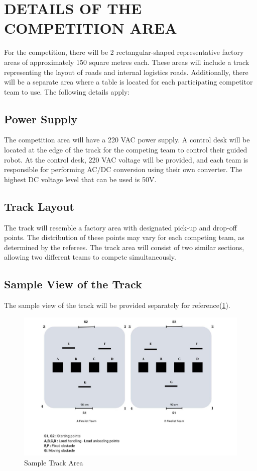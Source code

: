 \documentclass[../../main]{subfiles}
\begin{document}
\section{DETAILS OF THE COMPETITION AREA}

For the competition, there will be 2 rectangular-shaped representative factory areas of approximately 150 square metres each. These areas will include a track representing the layout of roads and internal logistics roads. Additionally, there will be a separate area where a table is located for each participating competitor team to use. The following details apply:

\subsection{Power Supply}
The competition area will have a 220 VAC power supply. A control desk will be located at the edge of the track for the competing team to control their guided robot. At the control desk, 220 VAC voltage will be provided, and each team is responsible for performing AC/DC conversion using their own converter. The highest DC voltage level that can be used is 50V.


\subsection{Track Layout}
The track will resemble a factory area with designated pick-up and drop-off points. The distribution of these points may vary for each competing team, as determined by the referees. The track area will consist of two similar sections, allowing two different teams to compete simultaneously.

\newpage
\subsection{Sample View of the Track}
The sample view of the track will be provided separately for reference(\cref{fig:tekno2}).

\begin{figure}[h!]
    \centering
    \includegraphics[width=\textwidth]{img/cmparea.jpg}
    \caption{Sample Track Area}
    \label{fig:tekno2}
\end{figure}
\end{document}

